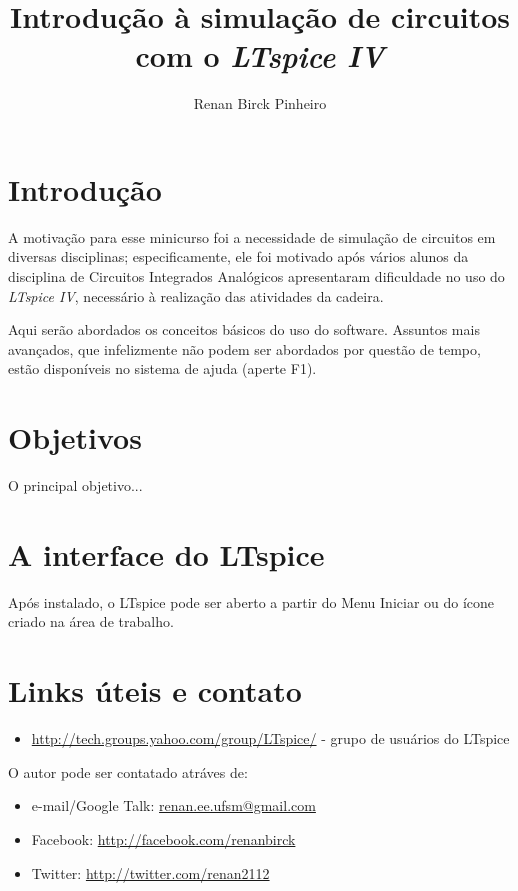 \documentclass[]{report}
\title{\textbf{Introdução à simulação de circuitos com o \textit{LTspice IV}}}
\author{Renan Birck Pinheiro}
\begin{document}


\chapter{Introdução}
A motivação para esse minicurso foi a necessidade de simulação de circuitos em diversas disciplinas; especificamente, ele foi motivado após vários alunos da disciplina de Circuitos Integrados Analógicos apresentaram dificuldade no uso do \textit{LTspice IV}, necessário à realização das atividades da cadeira.

Aqui serão abordados os conceitos básicos do uso do software. Assuntos mais avançados, que infelizmente não podem ser abordados por questão de tempo, estão disponíveis no sistema de ajuda (aperte F1).

\chapter{Objetivos}
O principal objetivo...

\chapter{A interface do LTspice}
Após instalado, o LTspice pode ser aberto a partir do Menu Iniciar ou do ícone criado na área de trabalho.

\chapter{Links úteis e contato}
\begin{itemize}
\item \url{http://tech.groups.yahoo.com/group/LTspice/} - grupo de usuários do LTspice
\end{itemize}

O autor pode ser contatado atráves de:

\begin{itemize}
\item e-mail/Google Talk: \url{renan.ee.ufsm@gmail.com}
\item Facebook: \url{http://facebook.com/renanbirck}
\item Twitter: \url{http://twitter.com/renan2112}
\end{itemize}
\end{document}
